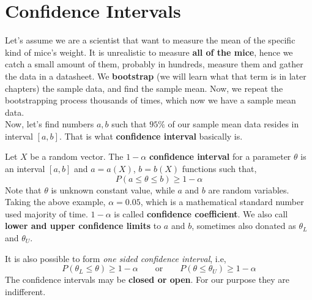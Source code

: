 \section{Confidence Intervals}
Let's assume we are a scientist that want to measure the mean of the specific kind of mice's weight.
It is unrealistic to measure \textbf{all of the mice}, hence we catch a small amount of them, probably in hundreds, measure them and gather the data in a datasheet. We \textbf{bootstrap} (we will learn what that term is in later chapters) the sample data, and find the sample mean. Now, we repeat the bootstrapping process thousands of times, which now we have a sample mean data.
\\
Now, let's find numbers $a,b$ such that $95\%$ of our sample mean data resides in interval $[a,b]$. That is what \textbf{confidence interval} basically is.
\begin{definition}
    Let $X$ be a random vector. The $1 - \alpha$ \textbf{confidence interval} for a parameter $\theta$ is an interval $[a,b]$ and $a = a(X)$, $b = b(X)$ functions such that,
    \[ P(a \le \theta \le b) \ge  1 - \alpha \]
    Note that $\theta$ is unknown constant value, while  $a$ and $b$ are random variables. 
   \\
   Taking the above example, $\alpha = 0.05$, which is a mathematical standard number used majority of time. $1 - \alpha$ is called \textbf{confidence coefficient}. We also call \textbf{lower and upper confidence limits} to $a$ and $b$, sometimes also donated as $\theta_{L}$ and $\theta_{U}$.
\end{definition}
It is also possible to form \textit{one sided confidence interval}, i.e,
\[ P( \theta_{L} \le \theta ) \ge 1 - \alpha  \qquad \text{or} \qquad P( \theta \le \theta_{U}) \ge 1 - \alpha\]
The confidence intervals may be \textbf{closed or open}. For our purpose they are indifferent. 


